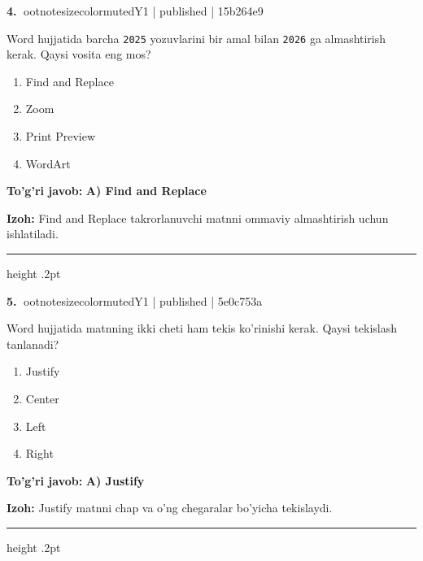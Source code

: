 \documentclass[10pt,a4paper]{article}
\begin{document}
\textbf{\color{ink}4.} {ootnotesizecolor{muted}Y1 | published | 15b264e9}
\par
Word hujjatida barcha \texttt{2025} yozuvlarini bir amal bilan \texttt{2026} ga almashtirish kerak. Qaysi vosita eng mos?
\begin{enumerate}[label=\Alph*),leftmargin=9mm]
\item Find and Replace
\item Zoom
\item Print Preview
\item WordArt
\end{enumerate}
\begin{tcolorbox}[enhanced,breakable,colback=teal!4,colframe=teal!55!black,boxrule=0.45pt,arc=1.2mm,left=2.8mm,right=2.8mm,top=2mm,bottom=2mm]
\textbf{\color{teal}To'g'ri javob:} \textbf{A) Find and Replace}
\par\smallskip
\textbf{Izoh:} Find and Replace takrorlanuvchi matnni ommaviy almashtirish uchun ishlatiladi.
\end{tcolorbox}
\vspace{2mm}\hrule height .2pt\vspace{2mm}

\textbf{\color{ink}5.} {ootnotesizecolor{muted}Y1 | published | 5e0c753a}
\par
Word hujjatida matnning ikki cheti ham tekis ko'rinishi kerak. Qaysi tekislash tanlanadi?
\begin{enumerate}[label=\Alph*),leftmargin=9mm]
\item Justify
\item Center
\item Left
\item Right
\end{enumerate}
\begin{tcolorbox}[enhanced,breakable,colback=teal!4,colframe=teal!55!black,boxrule=0.45pt,arc=1.2mm,left=2.8mm,right=2.8mm,top=2mm,bottom=2mm]
\textbf{\color{teal}To'g'ri javob:} \textbf{A) Justify}
\par\smallskip
\textbf{Izoh:} Justify matnni chap va o'ng chegaralar bo'yicha tekislaydi.
\end{tcolorbox}
\vspace{2mm}\hrule height .2pt\vspace{2mm}
\end{document}
